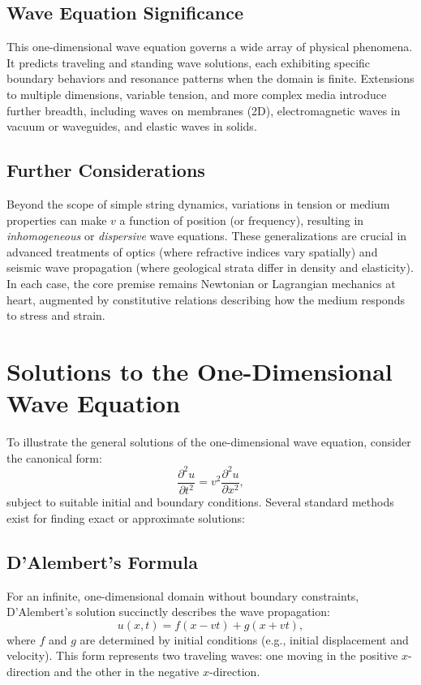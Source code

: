 \documentclass{article}
\begin{document}
\subsection{Wave Equation Significance}
This one-dimensional wave equation governs a wide array of physical phenomena. It predicts traveling and standing wave solutions, each exhibiting specific boundary behaviors and resonance patterns when the domain is finite. Extensions to multiple dimensions, variable tension, and more complex media introduce further breadth, including waves on membranes (2D), electromagnetic waves in vacuum or waveguides, and elastic waves in solids.

\subsection{Further Considerations}
Beyond the scope of simple string dynamics, variations in tension or medium properties can make $v$ a function of position (or frequency), resulting in \emph{inhomogeneous} or \emph{dispersive} wave equations. These generalizations are crucial in advanced treatments of optics (where refractive indices vary spatially) and seismic wave propagation (where geological strata differ in density and elasticity). In each case, the core premise remains Newtonian or Lagrangian mechanics at heart, augmented by constitutive relations describing how the medium responds to stress and strain.

\section{Solutions to the One-Dimensional Wave Equation}

To illustrate the general solutions of the one-dimensional wave equation, consider the canonical form:
\begin{equation}\label{eq:wave_1d}
\frac{\partial^2 u}{\partial t^2} = v^2 \frac{\partial^2 u}{\partial x^2},
\end{equation}
subject to suitable initial and boundary conditions. Several standard methods exist for finding exact or approximate solutions:

\subsection{D'Alembert's Formula}
For an infinite, one-dimensional domain without boundary constraints, D'Alembert's solution succinctly describes the wave propagation:
\begin{equation}
    u(x,t) = f(x - vt) + g(x + vt),
\end{equation}
where $f$ and $g$ are determined by initial conditions (e.g., initial displacement and velocity). This form represents two traveling waves: one moving in the positive $x$-direction and the other in the negative $x$-direction.
\end{document}
